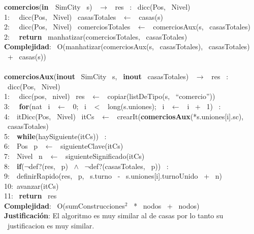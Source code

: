 \begin{Algoritmos}
    \makebox[\linewidth]{\rule{\textwidth}{0.4pt}} 
    \newpage
    \noindent\makebox[\linewidth]{\rule{\textwidth}{0.4pt}}
    \textbf{comercios}(\textbf{in \ }SimCity \ s) \ $\rightarrow $ \ res \ : \ dicc(Pos, \ Nivel)\\
    1: \  \ dicc(Pos, \ Nivel) \ casasTotales \ $\leftarrow$ \ casas(s)\\
    2: \  \ dicc(Pos, \ Nivel) \ comerciosTotales \ $\leftarrow$ \ comerciosAux(s, \ casasTotales)\\
    2: \  \ \textbf{return} \ manhatizar(comerciosTotales, \ casasTotales)\\
    \textbf{Complejidad}: \ O(manhatizar(comerciosAux(s, \ casasTotales), \ casasTotales) \ + \ casas(s))\\
    \makebox[\linewidth]{\rule{\textwidth}{0.4pt}}
    \\
    \makebox[\linewidth]{\rule{\textwidth}{0.4pt}}
    \textbf{comerciosAux}(\textbf{inout} \ SimCity \ s, \ \textbf{inout} \ casasTotales) \ $\rightarrow $ \ res \ : \ dicc(Pos, \ Nivel)\\
    1: \  \ dicc(pos, \ nivel) \ res \ $\leftarrow$ \ copiar(listDeTipo(s, \ ``comercio''))\\
    3: \  \ \textbf{for}(nat \ i \ $\leftarrow$ \ 0; \ i \ $<$ \ long(s.uniones); \ i \ $\leftarrow$ \ i \ + \ 1) \ : \ \\
    4:\indent  \  \ itDicc(Pos, \ Nivel) \ itCs \ $\leftarrow$ \ crearIt(\textbf{comerciosAux}(*s.uniones[i].sc), \ casasTotales)\\
    5:\indent  \  \ \textbf{while}(haySiguiente(itCs)) \ :\\
    6:\indent \indent  \  \ Pos \ p \ $\leftarrow$ \ siguienteClave(itCs)\\
    7:\indent \indent  \  \ Nivel \ n \ $\leftarrow$ \ siguienteSignificado(itCs)\\
    8:\indent \indent  \  \ \textbf{if}($\neg$def?(res, \ p) \ $\wedge$ \ $\neg$def?(casasTotales, \ p)) \ :\\
    9:\indent \indent \indent  \  \ definirRapido(res, \ p, \ s.turno \ - \ s.uniones[i].turnoUnido \ + \ n)\\
    10:\indent \indent  \ avanzar(itCs)\\
    11: \ \textbf{return} \ res\\
    \textbf{Complejidad}: \ O(sumConstrucciones$^2$ \ * \ nodos \ + \ nodos)\\
    \textbf{Justificaci\'on}: El algoritmo es muy similar al de casas por lo tanto su \
    justificacion es muy similar.\\

\end{Algoritmos}
